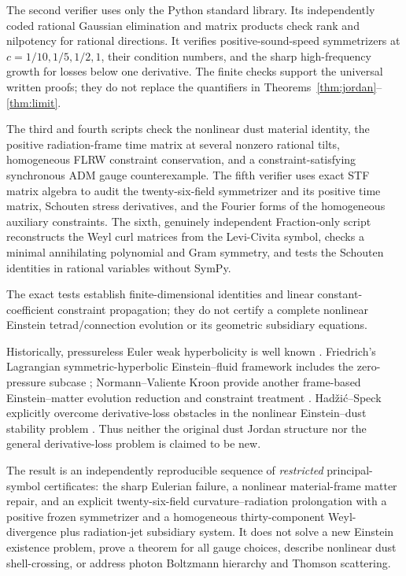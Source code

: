 \documentclass[11pt,a4paper]{article}
\begin{document}
The second verifier uses only the
Python standard library. Its
independently coded rational
Gaussian elimination and matrix
products check rank and nilpotency
for rational directions. It verifies
positive-sound-speed symmetrizers
at $c=1/10,1/5,1/2,1$, their
condition numbers, and the
sharp high-frequency growth
for losses below one derivative.
The finite checks support the
universal written proofs; they
do not replace the quantifiers in
Theorems~\ref{thm:jordan}--\ref{thm:limit}.

The third and fourth scripts check
the nonlinear dust material identity,
the positive radiation-frame time
matrix at several nonzero rational
tilts, homogeneous FLRW constraint
conservation, and a constraint-satisfying
synchronous ADM gauge counterexample.
The fifth verifier uses exact STF
matrix algebra to audit
the twenty-six-field symmetrizer
and its positive time matrix,
Schouten stress derivatives, and
the Fourier forms of the
homogeneous auxiliary constraints.
The sixth, genuinely independent
Fraction-only script reconstructs
the Weyl curl matrices from the
Levi-Civita symbol, checks a
minimal annihilating polynomial
and Gram symmetry, and tests the
Schouten identities in rational
variables without SymPy.

The exact tests establish
finite-dimensional identities and
linear constant-coefficient
constraint propagation; they do
not certify a complete nonlinear
Einstein tetrad/connection
evolution or its geometric
subsidiary equations.

Historically, pressureless Euler weak
hyperbolicity is well known
\cite{bouchut}. Friedrich's
Lagrangian symmetric-hyperbolic
Einstein--fluid framework includes
the zero-pressure subcase
\cite{friedrich}; Normann--Valiente
Kroon provide another frame-based
Einstein--matter evolution reduction
and constraint treatment \cite{normann}.
Had\v{z}i\'c--Speck explicitly
overcome derivative-loss obstacles
in the nonlinear Einstein--dust
stability problem \cite{hadzic}.
Thus neither the original
dust Jordan structure nor the
general derivative-loss problem
is claimed to be new.

The result is an independently
reproducible sequence of
\emph{restricted} principal-symbol
certificates: the sharp Eulerian
failure, a nonlinear
material-frame matter repair,
and an explicit twenty-six-field
curvature--radiation prolongation
with a positive frozen symmetrizer
and a homogeneous thirty-component
Weyl-divergence plus radiation-jet
subsidiary system.
It does not solve a new Einstein
existence problem, prove a theorem
for all gauge choices, describe
nonlinear dust shell-crossing, or
address photon Boltzmann hierarchy
and Thomson scattering.
\end{document}
